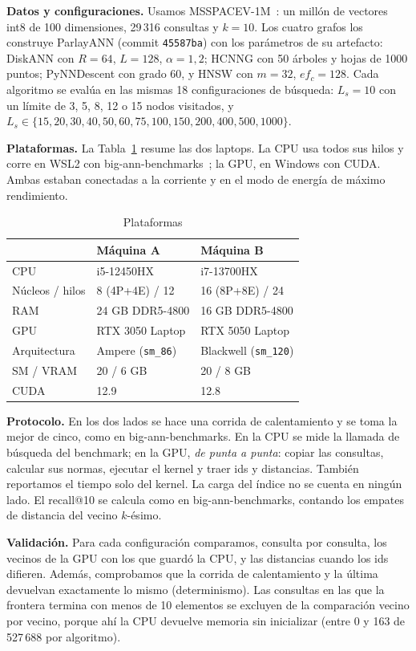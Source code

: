 \documentclass[conference,10pt]{IEEEtran}
\begin{document}
\textbf{Datos y configuraciones.} Usamos MSSPACEV-1M~\cite{spacev1b,simhadri2022bigann}:
un millón de vectores int8 de 100 dimensiones, 29\,316 consultas y $k=10$. Los cuatro
grafos los construye ParlayANN (commit \texttt{45587ba}) con los parámetros de su
artefacto: DiskANN con $R=64$, $L=128$, $\alpha=1{,}2$; HCNNG con 50 árboles y hojas de
1000 puntos; PyNNDescent con grado 60, y HNSW con $m=32$, $ef_c=128$. Cada algoritmo se
evalúa en las mismas 18 configuraciones de búsqueda: $L_s=10$ con un límite de 3, 5, 8, 12
o 15 nodos visitados, y $L_s \in \{15, 20, 30, 40, 50, 60, 75, 100, 150, 200, 400, 500,
1000\}$.

\textbf{Plataformas.} La Tabla~\ref{tab:plataformas} resume las dos laptops. La CPU usa
todos sus hilos y corre en WSL2 con big-ann-benchmarks~\cite{simhadri2022bigann}; la GPU,
en Windows con CUDA. Ambas estaban conectadas a la corriente y en el modo de energía de
máximo rendimiento.

\begin{table}[t]
\centering
\caption{Plataformas}
\label{tab:plataformas}
\begin{tabular}{lll}
\toprule
 & Máquina A & Máquina B \\
\midrule
CPU & i5-12450HX & i7-13700HX \\
Núcleos / hilos & 8 (4P+4E) / 12 & 16 (8P+8E) / 24 \\
RAM & 24 GB DDR5-4800 & 16 GB DDR5-4800 \\
GPU & RTX 3050 Laptop & RTX 5050 Laptop \\
Arquitectura & Ampere (\texttt{sm\_86}) & Blackwell (\texttt{sm\_120}) \\
SM / VRAM & 20 / 6 GB & 20 / 8 GB \\
CUDA & 12.9 & 12.8 \\
\bottomrule
\end{tabular}
\end{table}

\textbf{Protocolo.} En los dos lados se hace una corrida de calentamiento y se toma la
mejor de cinco, como en big-ann-benchmarks. En la CPU se mide la llamada de búsqueda del
benchmark; en la GPU, \emph{de punta a punta}: copiar las consultas, calcular sus normas,
ejecutar el kernel y traer ids y distancias. También reportamos el tiempo solo del kernel.
La carga del índice no se cuenta en ningún lado. El recall@10 se calcula como en
big-ann-benchmarks, contando los empates de distancia del vecino $k$-ésimo.

\textbf{Validación.} Para cada configuración comparamos, consulta por consulta, los
vecinos de la GPU con los que guardó la CPU, y las distancias cuando los ids difieren.
Además, comprobamos que la corrida de calentamiento y la última devuelvan exactamente lo
mismo (determinismo). Las consultas en las que la frontera termina con menos de 10
elementos se excluyen de la comparación vecino por vecino, porque ahí la CPU devuelve
memoria sin inicializar (entre 0 y 163 de 527\,688 por algoritmo).
\end{document}
